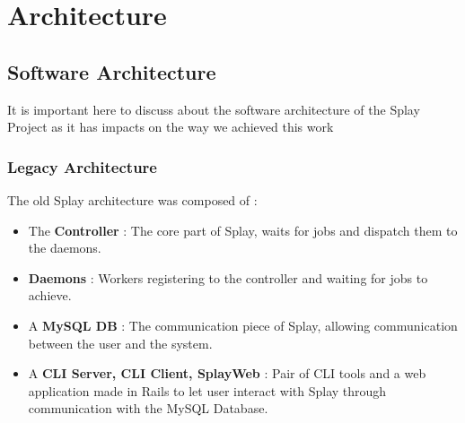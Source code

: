 \documentclass{eplmastersthesis}
\begin{document}


  \chapter{Architecture}


    \section{Software Architecture}

      It is important here to discuss about the software architecture of the
      Splay Project as it has impacts on the way we achieved this work

      \subsection{Legacy Architecture}

        The old Splay architecture was composed of :

        \begin{itemize}
          \item The \textbf{Controller} : The core part of Splay, waits for jobs
          and dispatch them to the daemons.
          \item \textbf{Daemons} : Workers registering to the controller and waiting
          for jobs to achieve.
          \item A \textbf{MySQL DB} : The communication piece of Splay, allowing
          communication between the user and the system.
          \item A \textbf{CLI Server, CLI Client, SplayWeb} : Pair of CLI tools
          and a web application made in Rails to let user interact with
          Splay through communication with the MySQL Database.
        \end{itemize}
\end{document}
